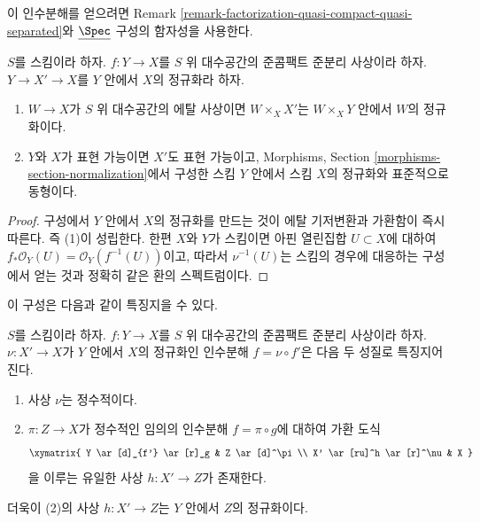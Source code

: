 \noindent
이 인수분해를 얻으려면 Remark
\ref{remark-factorization-quasi-compact-quasi-separated}와
$\underline{\Spec}$ 구성의 함자성을 사용한다.

\begin{lemma}
\label{lemma-properties-normalization}
$S$를 스킴이라 하자. $f : Y \to X$를 $S$ 위 대수공간의 준콤팩트
준분리 사상이라 하자. $Y \to X' \to X$를 $Y$ 안에서 $X$의 정규화라
하자.
\begin{enumerate}
\item $W \to X$가 $S$ 위 대수공간의 에탈 사상이면
$W \times_X X'$는 $W \times_X Y$ 안에서 $W$의 정규화이다.
\item $Y$와 $X$가 표현 가능이면 $X'$도 표현 가능이고, Morphisms,
Section \ref{morphisms-section-normalization}에서 구성한 스킴 $Y$ 안에서
스킴 $X$의 정규화와 표준적으로 동형이다.
\end{enumerate}
\end{lemma}

\begin{proof}
구성에서 $Y$ 안에서 $X$의 정규화를 만드는 것이 에탈 기저변환과
가환함이 즉시 따른다. 즉 (1)이 성립한다. 한편 $X$와 $Y$가 스킴이면
아핀 열린집합 $U \subset X$에 대하여
$f_*\mathcal{O}_Y(U) = \mathcal{O}_Y(f^{-1}(U))$이고, 따라서
$\nu^{-1}(U)$는 스킴의 경우에 대응하는 구성에서 얻는 것과 정확히 같은
환의 스펙트럼이다.
\end{proof}

\noindent
이 구성은 다음과 같이 특징지을 수 있다.

\begin{lemma}
\label{lemma-characterize-normalization}
$S$를 스킴이라 하자. $f : Y \to X$를 $S$ 위 대수공간의 준콤팩트
준분리 사상이라 하자. $\nu : X' \to X$가 $Y$ 안에서 $X$의 정규화인
인수분해 $f = \nu \circ f'$은 다음 두 성질로 특징지어진다.
\begin{enumerate}
\item 사상 $\nu$는 정수적이다.
\item $\pi : Z \to X$가 정수적인 임의의 인수분해
$f = \pi \circ g$에 대하여 가환 도식
$$
\xymatrix{
Y \ar[d]_{f'} \ar[r]_g & Z \ar[d]^\pi \\
X' \ar[ru]^h \ar[r]^\nu & X
}
$$
을 이루는 유일한 사상 $h : X' \to Z$가 존재한다.
\end{enumerate}
더욱이 (2)의 사상 $h : X' \to Z$는 $Y$ 안에서 $Z$의 정규화이다.
\end{lemma}

